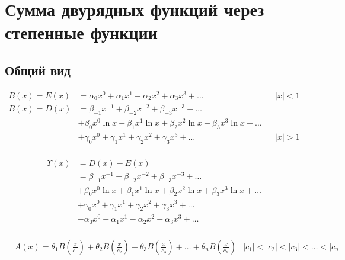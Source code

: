 
\section{Сумма двурядных функций через степенные функции}

\subsection{Общий вид}

\begin{equation*} \begin{aligned}
B(x) = E(x) &=
  \alpha_0 x^0
+ \alpha_1 x^1
+ \alpha_2 x^2
+ \alpha_3 x^3
+ \ldots &
&|x| < 1 \\
%
B(x) = D(x) &=   
  \beta_{-1} x^{-1}
+ \beta_{-2} x^{-2}
+ \beta_{-3} x^{-3}
+ \ldots \\ &
+ \beta_0 x^0 \ln{x}
+ \beta_1 x^1 \ln{x}
+ \beta_2 x^2 \ln{x}
+ \beta_3 x^3 \ln{x}
+ \ldots \\ &
+ \gamma_0 x^0
+ \gamma_1 x^1
+ \gamma_2 x^2
+ \gamma_3 x^3
+ \ldots &
&|x| > 1 \\
\end{aligned} \end{equation*}

\begin{equation*} \begin{aligned}
\Upsilon(x) &= D(x) - E(x) \\ &=
  \beta_{-1} x^{-1}
+ \beta_{-2} x^{-2}
+ \beta_{-3} x^{-3}
+ \ldots \\ &
+ \beta_0 x^0 \ln{x}
+ \beta_1 x^1 \ln{x}
+ \beta_2 x^2 \ln{x}
+ \beta_3 x^3 \ln{x}
+ \ldots \\ &
+ \gamma_0 x^0
+ \gamma_1 x^1
+ \gamma_2 x^2
+ \gamma_3 x^3
+ \ldots \\ &
- \alpha_0 x^0
- \alpha_1 x^1
- \alpha_2 x^2
- \alpha_3 x^3
+ \ldots \\
\end{aligned} \end{equation*}

\begin{equation*} \begin{aligned}
&A(x) =
  \theta_1 B{\left(\frac{x}{c_1} \right)}
+ \theta_2 B{\left(\frac{x}{c_2} \right)}
+ \theta_3 B{\left(\frac{x}{c_3} \right)}
+ \ldots
+ \theta_n B{\left(\frac{x}{c_n} \right)}
%
&|c_1| < |c_2| < |c_3| < \ldots < |c_n|
\end{aligned} \end{equation*}

